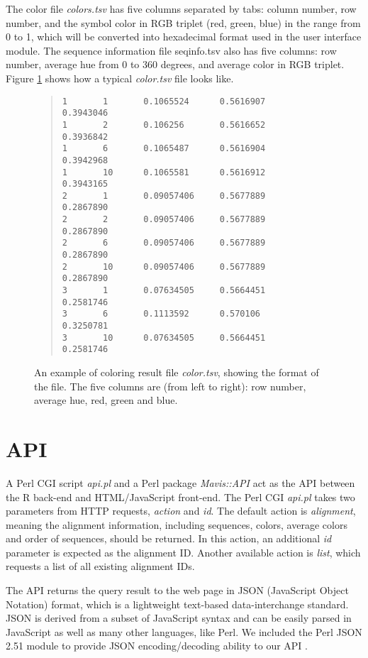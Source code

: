 The color file \emph{colors.tsv} has five columns separated by tabs: column number, row number, and the symbol color in RGB triplet (red, green, blue) in the range from 0 to 1, which will be converted into hexadecimal format used in the user interface module. The sequence information file seqinfo.tsv also has five columns: row number, average hue from 0 to 360 degrees, and average color in RGB triplet. Figure \ref{fig:color.tsv} shows how a typical \emph{color.tsv} file looks like.
\begin{figure}[hb]
\begin{quote}
\begin{verbatim}
1       1       0.1065524      0.5616907       0.3943046
1       2       0.106256       0.5616652       0.3936842
1       6       0.1065487      0.5616904       0.3942968
1       10      0.1065581      0.5616912       0.3943165
2       1       0.09057406     0.5677889       0.2867890
2       2       0.09057406     0.5677889       0.2867890
2       6       0.09057406     0.5677889       0.2867890
2       10      0.09057406     0.5677889       0.2867890
3       1       0.07634505     0.5664451       0.2581746
3       6       0.1113592      0.570106        0.3250781
3       10      0.07634505     0.5664451       0.2581746
\end{verbatim}
\end{quote}
\caption[Example of Coloring Result File]{An example of coloring result file \emph{color.tsv}, showing the format of the file. The five columns are (from left to right): row number, average hue, red, green and blue.}\label{fig:color.tsv}
\end{figure}

\section{API}

A Perl CGI script \emph{api.pl} and a Perl package \emph{Mavis::API} act as the API between the R back-end and HTML/JavaScript front-end. The Perl CGI \emph{api.pl} takes two parameters from HTTP requests, \emph{action} and \emph{id}. The default action is \emph{alignment}, meaning the alignment information, including sequences, colors, average colors and order of sequences, should be returned. In this action, an additional \emph{id} parameter is expected as the alignment ID. Another available action is \emph{list}, which requests a list of all existing alignment IDs.

The API returns the query result to the web page in JSON (JavaScript Object Notation) format, which is a lightweight text-based data-interchange standard. JSON is derived from a subset of JavaScript syntax and can be easily parsed in JavaScript as well as many other languages, like Perl. We included the Perl JSON 2.51 module to provide JSON encoding/decoding ability to our API \cite{crockford2006application}.

